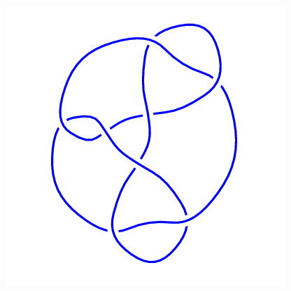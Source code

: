 \begin{figure}[H]
\begin{minipage}[b]{.18\linewidth}
	\end{minipage}
	\begin{minipage}[b]{.18\linewidth}
		\centering
		\includegraphics[width=\linewidth]{../data/8_21.png}
	\end{minipage}
\end{figure}
